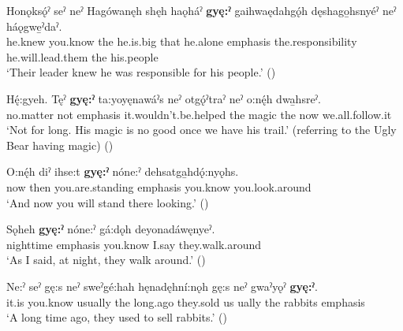 \ea
\label{ex:gpar119}
\gll Honǫksǫ́ˀ seˀ neˀ Hagówanęh shęh haǫháˀ \textbf{gyę:ˀ} gaihwaędahgǫ́h dęshago̱hsnyéˀ neˀ háǫgwe̱ˀdaˀ.\\
he.knew you.know the he.is.big that he.alone emphasis the.responsibility he.will.lead.them the his.people\\
\glt ‘Their leader knew he was responsible for his people.’ (\cite{carrier_legends_2013})
\z

\ea
\label{ex:gpar120}
\gll Hę́:gyeh. Tęˀ \textbf{gyę:ˀ} ta:yoyęnawáˀs neˀ otgǫ́ˀtraˀ neˀ o:nę́h dwa̱hsreˀ.\\
no.matter not emphasis it.wouldn’t.be.helped the magic the now we.all.follow.it\\
\glt ‘Not for long. His magic is no good once we have his trail.’ (referring to the Ugly Bear having magic) (\cite{carrier_legends_2013})
\z

\ea
\label{ex:gpar121}
\gll O:nę́h diˀ ihse:t \textbf{gyę:ˀ} nóne:ˀ dehsatga̱hdǫ́:nyǫhs.\\
now then you.are.standing emphasis you.know you.look.around\\
\glt ‘And now you will stand there looking.’ (\cite{mithun_how_1980})
\z

\ea
\label{ex:gpar122}
\gll Sǫheh \textbf{gyę:ˀ} nóne:ˀ gá:dǫh deyonadáwęnyeˀ.\\
nighttime emphasis you.know I.say they.walk.around\\
\glt ‘As I said, at night, they walk around.’ (\cite{mithun_how_1980})
\z

\ea
\label{ex:gpar123}
\gll Ne:ˀ seˀ gę:s neˀ sweˀgé:hah hęnadęhní:nǫh gę:s neˀ gwaˀyǫˀ \textbf{gyę:ˀ}.\\
it.is you.know usually the long.ago they.sold us ually the rabbits emphasis\\
\glt ‘A long time ago, they used to sell rabbits.’ (\cite{mithun_how_1980})
\z

